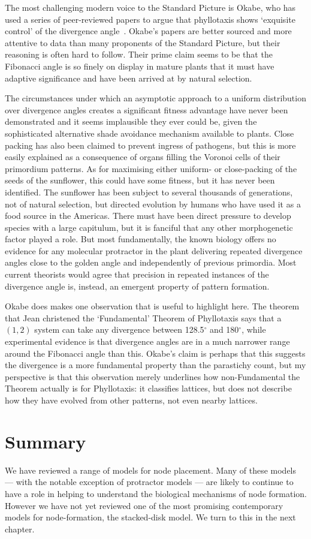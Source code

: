 The most challenging modern voice to the Standard Picture is Okabe, who has used a series of peer-reviewed papers to argue that phyllotaxis shows `exquisite control' of the divergence angle~\autocite{okabeRiddlePhyllotaxisExquisite2016}. Okabe's papers are better sourced and more attentive to data than many proponents of the Standard Picture, but their reasoning is often hard to follow. Their prime claim seems to be that the Fibonacci angle is so finely on display in mature plants that it must have adaptive significance and have been arrived at by natural selection.

The circumstances under which an asymptotic approach to a uniform distribution over divergence angles creates a significant fitness advantage have never been demonstrated and it seems implausible they ever could be, given the sophisticated alternative shade avoidance mechanism available to plants. Close packing has also been claimed to prevent ingress of pathogens, but this is more easily explained as a consequence of organs filling the Voronoi cells of their primordium patterns. As for maximising either uniform- or close-packing of the seeds of the sunflower, this could have some fitness, but it has never been identified. The sunflower has been subject to several thousands of generations, not of natural selection, but directed evolution by humans who have used it as a food source in the Americas. There must have been direct pressure to develop species with a large capitulum, but it is fanciful that any other morphogenetic factor played a role. 
But most fundamentally, the known biology offers no evidence for any molecular protractor in the plant delivering repeated divergence angles close to the golden angle and independently of previous primordia. Most current theorists would agree that precision in repeated instances of the divergence angle is, instead, an emergent property of pattern formation. 

Okabe does makes one observation that is useful to highlight here. The theorem that Jean christened the `Fundamental' Theorem of Phyllotaxis says that a $(1,2)$ system can take any divergence between 128.5$^\circ$ and 180$^\circ$, while experimental evidence is that divergence angles are in a much narrower range around the Fibonacci angle than this. Okabe's claim is perhaps that this suggests the divergence is a more fundamental property than the parastichy count, but my perspective is that this observation merely underlines how non-Fundamental the Theorem actually is for Phyllotaxis: it classifies lattices, but does not describe how they have evolved from other patterns, not even nearby lattices. 

\section{Summary}
We have reviewed a range of models for node placement. Many of these models --- with the notable exception of protractor models --- are likely to continue to have a role in helping to understand the biological mechanisms of node formation. However we have not yet reviewed one of the most promising contemporary models for node-formation, the stacked-disk model. We turn to this in the next chapter.

